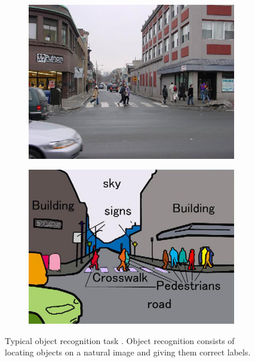 \begin{figure}[t]
  \begin{subfigure}[b]{0.5\textwidth}
    \includegraphics[width=\textwidth]{gfx/object-recognition-1}
    \label{fig:sec:context:object-recognition-1}
  \end{subfigure}
  \hfill
  \begin{subfigure}[b]{0.5\textwidth}
    \includegraphics[width=\textwidth]{gfx/object-recognition-2}
    \label{fig:sec:context:object-recognition-2}
  \end{subfigure}
  \caption{
    Typical object recognition task \cite{Wolf}.
    Object recognition consists of locating objects on a natural image and giving them correct labels.
  }
  \label{fig:sec:context:object-recognition}
\end{figure}

